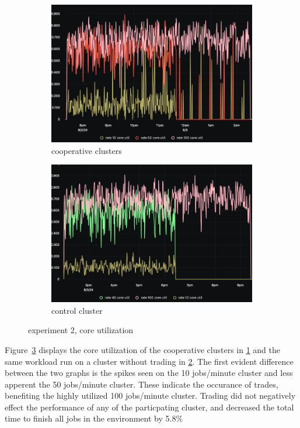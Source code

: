 \begin{figure}[H]
\centering
\begin{subfigure}{.5\textwidth}
  \centering
  \includegraphics[width=.9\linewidth]{./figures/experiment-two/trading.png}
  \caption{cooperative clusters}
  \label{fig:exp2coop}
\end{subfigure}%
\begin{subfigure}{.5\textwidth}
  \centering
  \includegraphics[width=.9\linewidth]{./figures/experiment-two/control.png}
  \caption{control cluster}
  \label{fig:exp2control}
\end{subfigure}
\caption{experiment 2, core utilization}
\label{fig:exp2coreutil}
\end{figure}

Figure~\ref{fig:exp2coreutil} displays the core utilization of the cooperative
clusters in \ref{fig:exp2coop} and the same workload run on a cluster without
trading in \ref{fig:exp2control}.
The first evident difference between the two graphs is the spikes seen on the
10 jobs/minute cluster and less apperent the 50 jobs/minute cluster. These
indicate the occurance of trades, benefiting the highly utilized 100
jobs/minute cluster. Trading did not negatively effect the performance of any
of the particpating cluster, and decreased the total time to finish all jobs in the environment by 5.8\%

